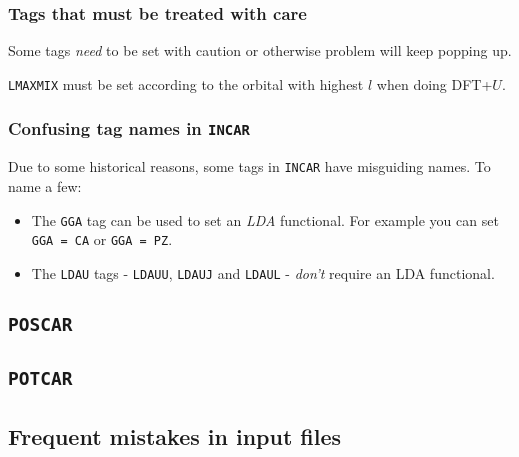 \documentclass[hyperref, a4paper]{article}
\begin{document}
\subsubsection{Tags that must be treated with care}

Some tags \emph{need} to be set with caution or otherwise problem will keep popping up.

\texttt{LMAXMIX} must be set according to the orbital with highest $l$ when doing DFT+$U$.

\subsubsection{Confusing tag names in \texttt{INCAR}}

Due to some historical reasons, some tags in \texttt{INCAR} have misguiding names.
To name a few:
\begin{itemize}
    \item The \texttt{GGA} tag can be used to set an \emph{LDA} functional. For example you can set \texttt{GGA = CA} or \texttt{GGA = PZ}.
    \item The \texttt{LDAU} tags - \texttt{LDAUU}, \texttt{LDAUJ} and \texttt{LDAUL} - \emph{don't} require an LDA functional. 
\end{itemize}

\subsection{\texttt{POSCAR}}

\subsection{\texttt{POTCAR}}



\subsection{Frequent mistakes in input files}
\end{document}

